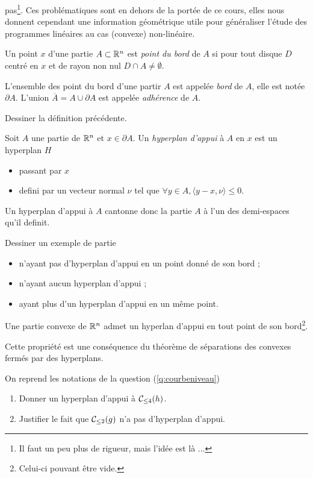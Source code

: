 \documentclass[11pt, a4paper]{article}
\begin{document}
pas\footnote{Il faut un peu plus de rigueur, mais l'idée est là
  ...}. Ces problématiques sont en dehors de la portée de ce cours,
elles nous donnent cependant une information géométrique utile pour
généraliser l'étude des programmes linéaires au cas (convexe)
non-linéaire.
\begin{defn}
  Un point $x$ d'une partie $A \subset \mathbb{R}^n$ est \emph{point du bord}
  de $A$ si pour tout disque $D$ centré en $x$ et de rayon non nul
  $D \cap A \neq \emptyset$.

  L'ensemble des point du bord d'une partir $A$ est appelée
  \emph{bord} de $A$, elle est notée $\partial A$. L'union
  $\overline{A} = A \cup \partial A$ est appelée \emph{adhérence} de
  $A$.
\end{defn}
\begin{question}
  Dessiner la définition précédente.
\end{question}
\begin{defn}
  Soit $A$ une partie de $\mathbb{R}^n$ et $x \in \partial A$. Un
  \emph{hyperplan d'appui} à $A$ en $x$ est un hyperplan $H$
  \begin{itemize}
  \item passant par $x$
  \item defini par un vecteur normal $\nu$ tel que
    $\forall y \in A, \langle y-x, \nu \rangle \leq 0$.
  \end{itemize}
\end{defn}
Un hyperplan d'appui à $A$ cantonne donc la partie $A$ à l'un des
demi-espaces qu'il definit.
\begin{question}
  Dessiner un exemple de partie
  \begin{itemize}
  \item n'ayant pas d'hyperplan d'appui en un point donné de son bord ;
  \item n'ayant aucun hyperplan d'appui ;
  \item ayant plus d'un hyperplan d'appui en un même point.
  \end{itemize}
\end{question}
\begin{prop}
  Une partie convexe de $\mathbb{R}^n$ admet un hyperlan d'appui en tout point
  de son bord\footnote{Celui-ci pouvant être vide.}.
\end{prop}
Cette propriété est une conséquence du théorème de séparations des
convexes fermés par des hyperplans.
\begin{question}
  On reprend les notations de la question (\ref{q:courbeniveau})
  \begin{enumerate}
  \item Donner un hyperplan d'appui à $\mathcal{C}_{\leq 4}(h)$.
  \item Justifier le fait que $\mathcal{C}_{\leq 2}(g)$ n'a pas d'hyperplan
    d'appui.
  \end{enumerate}
\end{question}
\end{document}

